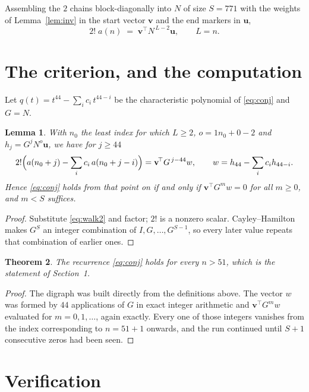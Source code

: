 \documentclass[11pt,a4paper]{article}
\theoremstyle{plain}
\newtheorem{theorem}{Theorem}
\newtheorem{lemma}[theorem]{Lemma}
\theoremstyle{definition}
\begin{document}
Assembling the $2$ chains block-diagonally into $N$ of size $S=771$ with the weights of
Lemma~\ref{lem:inv} in the start vector $\mathbf{v}$ and the end markers in
$\mathbf{u}$,
\begin{equation}\label{eq:walk2}
2!\;a(n)\;=\;\mathbf{v}^{\!\top}N^{\,L-2}\mathbf{u},\qquad L=n .
\end{equation}

\section{The criterion, and the computation}

Let $q(t)=t^{44}-\sum_i c_i\,t^{44-i}$ be the characteristic polynomial of
\eqref{eq:conj} and $G=N$.

\begin{lemma}\label{lem:crit}
With $n_0$ the least index for which $L\ge2$, $o=1n_0+0-2$ and
$h_j=G^{j}N^{o}\mathbf{u}$, we have for $j\ge44$
\[
2!\Bigl(a(n_0+j)-\sum_i c_i\,a(n_0+j-i)\Bigr)=\mathbf{v}^{\!\top}G^{\,j-44}w,
\qquad w=h_{44}-\sum_i c_i h_{44-i} .
\]
Hence \eqref{eq:conj} holds from that point on if and only if
$\mathbf{v}^{\!\top}G^{m}w=0$ for all $m\ge0$, and $m<S$ suffices.
\end{lemma}

\begin{proof}
Substitute \eqref{eq:walk2} and factor; $2!$ is a nonzero scalar. Cayley--Hamilton
makes $G^{S}$ an integer combination of $I,G,\dots,G^{S-1}$, so every later value repeats
that combination of earlier ones.
\end{proof}

\begin{theorem}
The recurrence \eqref{eq:conj} holds for every $n>51$, which is the statement of
Section~1.
\end{theorem}

\begin{proof}
The digraph was built directly from the definitions above. The vector $w$ was formed by
$44$ applications of $G$ in exact integer arithmetic and $\mathbf{v}^{\!\top}G^{m}w$
evaluated for $m=0,1,\dots$, again exactly. Every one of those integers vanishes from the
index corresponding to $n=51+1$ onwards, and the run continued until $S+1$ consecutive
zeros had been seen.
\end{proof}

\section{Verification}
\end{document}
